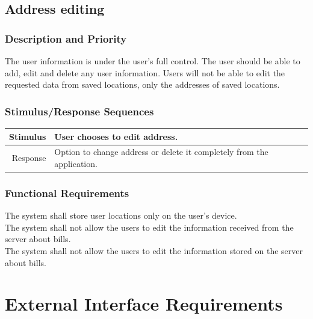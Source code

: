 \documentclass[12pt,oneside,letterpaper]{article}
\makeatletter
\newcounter{use_case}
\newcounter{functional_requirement}
\newcounter{tableline}
\newcommand{\functionalrequirementprinter}{\stepcounter{tableline}
\ifthenelse{\value{tableline}>1}{\refstepcounter{functional_requirement}
  FR-\arabic{functional_requirement}}{Requirement ID}&
}
\newenvironment{func_req}{
\setcounter{tableline}{0}
\begin{longtabu}{|@{\makebox[8em][r]{\functionalrequirementprinter}}|X|}
  \hline
  Description \\
}{
\end{longtabu}
}
\makeatother
\begin{document}
\subsection{Address editing}
\subsubsection{Description and Priority}
The user information is under the user's full control. The user should
be able to add, edit and delete any user information. Users will not
be able to edit the requested data from saved locations, only the
addresses of saved locations.
\subsubsection{Stimulus/Response Sequences}
\begin{longtabu}{|r|X|}
  \hline
  Stimulus & User chooses to edit address. \\
  \hline
  Response & Option to change address or delete it completely from the application. \\
  \hline
\end{longtabu}
\subsubsection{Functional Requirements}
\begin{func_req}
  \hline
  The system shall store user locations only on the user's device. \\
  \hline
  The system shall not allow the users to edit the information received from the server about bills.\\
  \hline
  The system shall not allow the users to edit the information stored on the server about bills.\\
  \hline
\end{func_req}

\section{External Interface Requirements}
\end{document}
